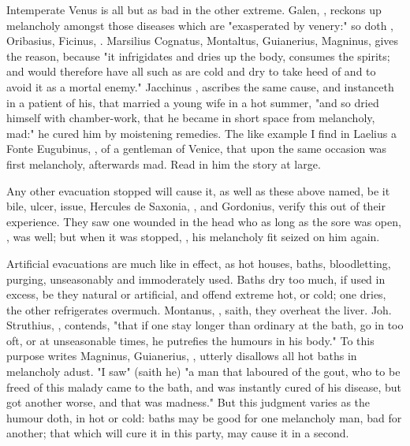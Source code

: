 Intemperate Venus is all but as bad in the other extreme. Galen,
, reckons up
melancholy amongst those diseases which are "exasperated
by venery:" so doth \Avicenna{},  Oribasius,
 Ficinus, . Marsilius Cognatus, Montaltus,  Guianerius,  Magninus,
 gives the reason,
because "it infrigidates and dries up the body, consumes
the spirits; and would therefore have all such as are cold and dry to take heed
of and to avoid it as a mortal enemy." Jacchinus , ascribes the same cause, and instanceth in a patient of his,
that married a young wife in a hot summer, "and so dried
himself with chamber-work, that he became in short space from melancholy, mad:"
he cured him by moistening remedies. The like example I find in Laelius a Fonte
Eugubinus, , of a gentleman of Venice, that
upon the same occasion was first melancholy, afterwards mad. Read in him the
story at large.

Any other evacuation stopped will cause it, as well as these above named, be it
bile, ulcer, issue, \etc{} Hercules de Saxonia,
, and Gordonius, verify this out of their
experience. They saw one wounded in the head who as long as the sore was open,
, was well; but when it was stopped,
, his melancholy fit seized on him again.

Artificial evacuations are much like in effect, as hot houses, baths,
bloodletting, purging, unseasonably and immoderately used.
Baths dry too much, if used in excess, be they natural or
artificial, and offend extreme hot, or cold; one dries,
the other refrigerates overmuch. Montanus, ,
saith, they overheat the liver. Joh. Struthius, , contends, "that if one stay longer
than ordinary at the bath, go in too oft, or at unseasonable times, he
putrefies the humours in his body." To this purpose writes Magninus,
 Guianerius, , utterly disallows all hot baths in melancholy adust.
"I saw" (saith he) "a man that laboured of the gout, who
to be freed of this malady came to the bath, and was instantly cured of his
disease, but got another worse, and that was madness." But this judgment varies
as the humour doth, in hot or cold: baths may be good for one melancholy man,
bad for another; that which will cure it in this party, may cause it in a
second.

